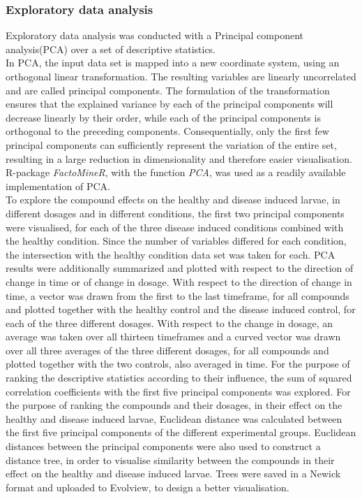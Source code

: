 \documentclass[a4paper,12pt]{article}
\begin{document}
\subsubsection{Exploratory data analysis}
Exploratory data analysis was conducted with a Principal component analysis(PCA)\cite{ref37} over a set of descriptive statistics. \\In PCA, the input data set is mapped into a new coordinate system, using an orthogonal linear transformation. The resulting variables are linearly uncorrelated and are called principal components. The formulation of the transformation ensures that the explained variance by each of the principal components will decrease linearly by their order, while each of the principal components is orthogonal to the preceding components. Consequentially, only the first few principal components can sufficiently represent the variation of the entire set, resulting in a large reduction in dimensionality and therefore easier visualisation.\\R-package \textit{FactoMineR}\cite{ref38}, with the function \textit{PCA}, was used as a readily available implementation of PCA. \\To explore the compound effects on the healthy and disease induced larvae, in different dosages and in different conditions, the first two principal components were visualised, for each of the three disease induced conditions combined with the healthy condition. Since the number of variables differed for each condition, the intersection with the healthy condition data set was taken for each. PCA results were additionally summarized and plotted with respect to the direction of change in time or of change in dosage. With respect to the direction of change in time, a vector was drawn from the first to the last timeframe, for all compounds and plotted together with the healthy control and the disease induced control, for each of the three different dosages. With respect to the change in dosage, an average was taken over all thirteen timeframes and a curved vector was drawn over all three averages of the three different dosages, for all compounds and plotted together with the two controls, also averaged in time. For the purpose of ranking the descriptive statistics according to their influence, the sum of squared correlation coefficients with the first five principal components was explored. For the purpose of ranking the compounds and their dosages, in their effect on the healthy and disease induced larvae, Euclidean distance was calculated between the first five principal components of the different experimental groups. Euclidean distances between the principal components were also used to construct a distance tree, in order to visualise similarity between the compounds in their effect on the healthy and disease induced larvae. Trees were saved in a Newick format and uploaded to Evolview\cite{ref39}, to design a better visualisation.
\end{document}
